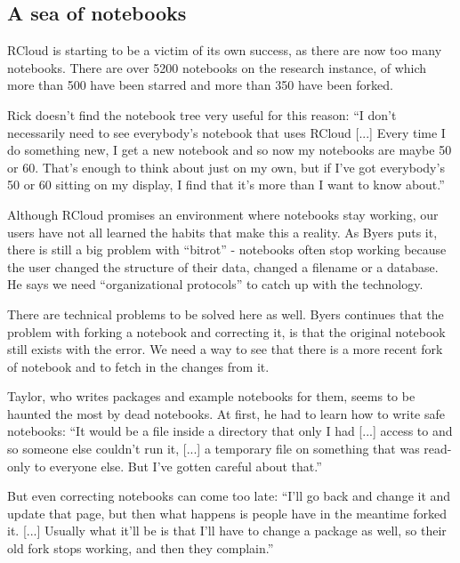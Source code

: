 

\subsection{A sea of notebooks}
RCloud is starting to be a victim of its own success, as there are now too many
notebooks.  There are over 5200 notebooks on the research instance, of which
more than 500 have been starred and more than 350 have been forked.

Rick doesn't find the notebook tree very useful for this reason: ``I
don't necessarily need to see everybody's notebook that uses RCloud [...] Every
time I do something new, I get a new notebook and so now my notebooks are maybe
50 or 60. That's enough to think about just on my own, but if I've got
everybody's 50 or 60 sitting on my display, I find that it's more than I want to
know about.''

Although RCloud promises an environment where notebooks stay working, our users
have not all learned the habits that make this a reality. As Byers puts it,
there is still a big problem with ``bitrot'' - notebooks often stop working
because the user changed the structure of their data, changed a filename or a
database.  He says we need ``organizational protocols'' to catch up with the
technology.

There are technical problems to be solved here as well. Byers continues that the
problem with forking a notebook and correcting it, is that the original notebook
still exists with the error.  We need a way to see that there is a more recent
fork of notebook and to fetch in the changes from it.

Taylor, who writes packages and example notebooks for them, seems to be
haunted the most by dead notebooks.  At first, he had to learn how to write safe
notebooks: ``It would be a file inside a directory that only I had [...] access
to and so someone else couldn't run it, [...] a temporary file on something that
was read-only to everyone else. But I've gotten careful about that.''

But even correcting notebooks can come too late: ``I'll go back and change it and update
that page, but then what happens is people have in the meantime forked it. [...]
Usually what it'll be is that I'll have to change a package as well, so
their old fork stops working, and then they complain.''

